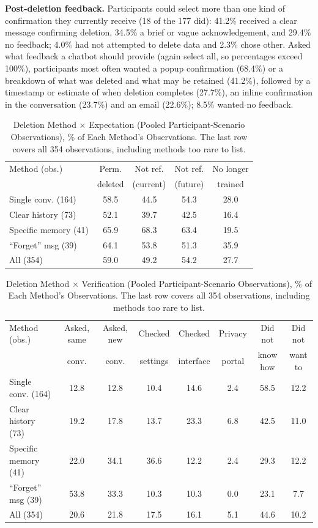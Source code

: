 \documentclass[conference,compsoc]{IEEEtran}
\begin{document}
\textbf{Post-deletion feedback.} Participants could select more than one kind of confirmation they currently receive (18 of the 177 did): 41.2\% received a clear message confirming deletion, 34.5\% a brief or vague acknowledgement, and 29.4\% no feedback; 4.0\% had not attempted to delete data and 2.3\% chose other. Asked what feedback a chatbot should provide (again select all, so percentages exceed 100\%), participants most often wanted a popup confirmation (68.4\%) or a breakdown of what was deleted and what may be retained (41.2\%), followed by a timestamp or estimate of when deletion completes (27.7\%), an inline confirmation in the conversation (23.7\%) and an email (22.6\%); 8.5\% wanted no feedback.

\begin{table}[t]
\centering
\caption{Deletion Method $\times$ Expectation (Pooled Participant-Scenario
Observations), \% of Each Method's Observations. The last row covers all 354
observations, including methods too rare to list.}
\label{tab:contingency}
\small
\setlength{\tabcolsep}{3pt}
\begin{tabular}{lcccc}
\toprule
Method (obs.) & Perm. & Not ref. & Not ref. & No longer \\
 & deleted & (current) & (future) & trained \\
\midrule
Single conv. (164)  & 58.5 & 44.5 & 54.3 & 28.0 \\
Clear history (73)  & 52.1 & 39.7 & 42.5 & 16.4 \\
Specific memory (41) & 65.9 & 68.3 & 63.4 & 19.5 \\
``Forget'' msg (39) & 64.1 & 53.8 & 51.3 & 35.9 \\
\midrule
All (354) & 59.0 & 49.2 & 54.2 & 27.7 \\
\bottomrule
\end{tabular}
\end{table}

\begin{table}[t]
\centering
\caption{Deletion Method $\times$ Verification (Pooled Participant-Scenario
Observations), \% of Each Method's Observations. The last row covers all 354
observations, including methods too rare to list.}
\label{tab:verification}
\small
\setlength{\tabcolsep}{4pt}
\begin{tabular}{lccccccc}
\toprule
Method (obs.) & Asked, same & Asked, new & Checked & Checked & Privacy & Did not & Did not \\
 & conv. & conv. & settings & interface & portal & know how & want to \\
\midrule
Single conv. (164)  & 12.8 & 12.8 & 10.4 & 14.6 & 2.4 & 58.5 & 12.2 \\
Clear history (73)  & 19.2 & 17.8 & 13.7 & 23.3 & 6.8 & 42.5 & 11.0 \\
Specific memory (41) & 22.0 & 34.1 & 36.6 & 12.2 & 2.4 & 29.3 & 12.2 \\
``Forget'' msg (39) & 53.8 & 33.3 & 10.3 & 10.3 & 0.0 & 23.1 & 7.7 \\
\midrule
All (354) & 20.6 & 21.8 & 17.5 & 16.1 & 5.1 & 44.6 & 10.2 \\
\bottomrule
\end{tabular}
\end{table}
\end{document}
